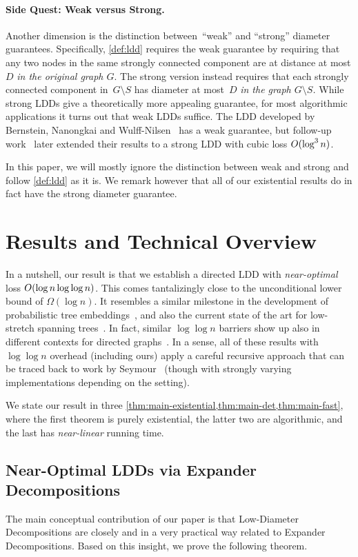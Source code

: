 \documentclass[letterpaper,11pt]{article}
\begin{document}
\paragraph{Side Quest: Weak versus Strong.}
Another dimension is the distinction between~``weak'' and ``strong'' diameter guarantees. Specifically, \cref{def:ldd} requires the weak guarantee by requiring that any two nodes in the same strongly connected component are at distance at most $D$ \emph{in the original graph $G$}. The strong version instead requires that each strongly connected component in~$G \setminus S$ has diameter at most~$D$ \emph{in the graph $G \setminus S$.} While strong LDDs give a theoretically more appealing guarantee, for most algorithmic applications it turns out that weak LDDs suffice. The LDD developed by Bernstein, Nanongkai and Wulff-Nilsen~\cite{BernsteinNW22} has a weak guarantee, but follow-up work~\cite{BringmannCF23} later extended their results to a strong LDD with cubic loss $O(\log^3 n)$.

In this paper, we will mostly ignore the distinction between weak and strong and follow \cref{def:ldd} as it is. We remark however that all of our existential results do in fact have the strong diameter guarantee. \section{Results and Technical Overview} \label{sec:overview}
In a nutshell, our result is that we establish a directed LDD with \emph{near-optimal} loss $O(\log n \log\log n)$. This comes tantalizingly close to the unconditional lower bound of $\Omega(\log n)$. It resembles a similar milestone in the development of probabilistic tree embeddings~\cite{Bartal98}, and also the current state of the art for low-stretch spanning trees~\cite{AbrahamN19}. In fact, similar $\log\log n$ barriers show up also in different contexts for directed graphs~\cite{ChechikLRS20}. In a sense, all of these results with $\log\log n$ overhead (including ours) apply a careful recursive approach that can be traced back to work by Seymour~\cite{Seymour95} (though with strongly varying implementations depending on the setting). 

We state our result in three \cref{thm:main-existential,thm:main-det,thm:main-fast}, where the first theorem is purely existential, the latter two are algorithmic, and the last has \emph{near-linear} running time.

\subsection{Near-Optimal LDDs via Expander Decompositions} \label{sec:overview:sec:ldd-exp}
The main conceptual contribution of our paper is that Low-Diameter Decompositions are closely and in a very practical way related to Expander Decompositions. Based on this insight, we prove the following theorem.
\end{document}
